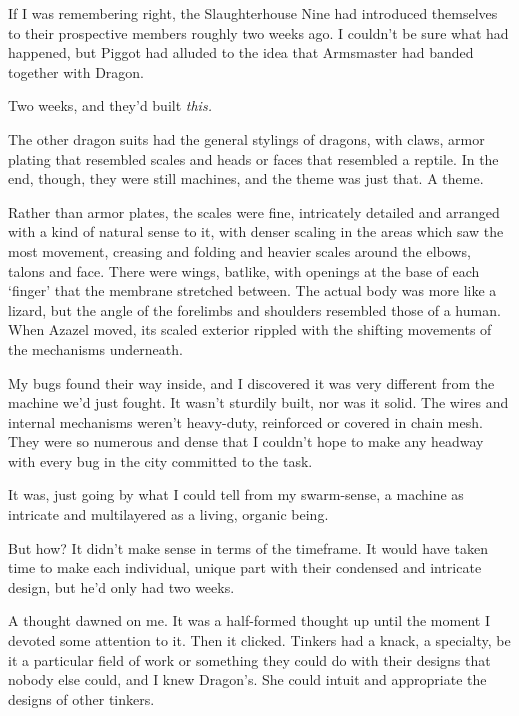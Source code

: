 





If I was remembering right, the Slaughterhouse Nine had introduced themselves to their prospective members roughly two weeks ago.  I couldn't be sure what had happened, but Piggot had alluded to the idea that Armsmaster had banded together with Dragon.



Two weeks, and they'd built \emph{this.}



The other dragon suits had the general stylings of dragons, with claws, armor plating that resembled scales and heads or faces that resembled a reptile.  In the end, though, they were still machines, and the theme was just that.  A theme.



Rather than armor plates, the scales were fine, intricately detailed and arranged with a kind of natural sense to it, with denser scaling in the areas which saw the most movement, creasing and folding and heavier scales around the elbows, talons and face.  There were wings, batlike, with openings at the base of each `finger' that the membrane stretched between.  The actual body was more like a lizard, but the angle of the forelimbs and shoulders resembled those of a human.  When Azazel moved, its scaled exterior rippled with the shifting movements of the mechanisms underneath.



My bugs found their way inside, and I discovered it was very different from the machine we'd just fought.  It wasn't sturdily built, nor was it solid.  The wires and internal mechanisms weren't heavy-duty, reinforced or covered in chain mesh.  They were so numerous and dense that I couldn't hope to make any headway with every bug in the city committed to the task.



It was, just going by what I could tell from my swarm-sense, a machine as intricate and multilayered as a living, organic being.



But how?  It didn't make sense in terms of the timeframe.  It would have taken time to make each individual, unique part with their condensed and intricate design, but he'd only had two weeks.



A thought dawned on me.  It was a half-formed thought up until the moment I devoted some attention to it.  Then it clicked.  Tinkers had a knack, a specialty, be it a particular field of work or something they could do with their designs that nobody else could, and I knew Dragon's.  She could intuit and appropriate the designs of other tinkers.



